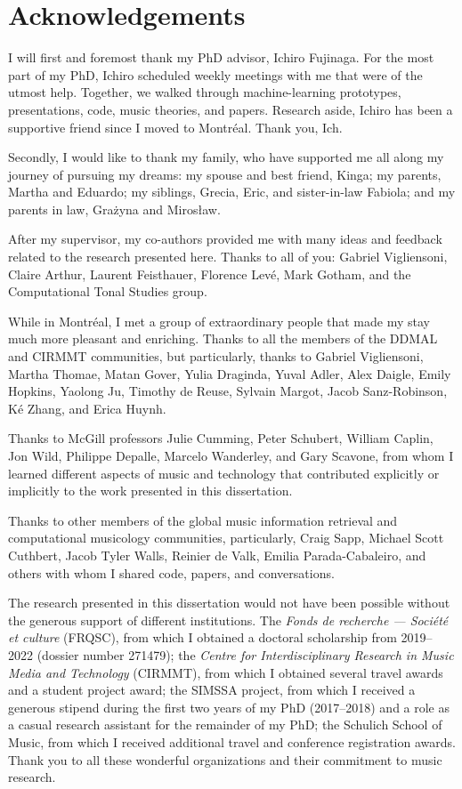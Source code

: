 \chapter*{Acknowledgements}
\label{chap:chap0-ack}

I will first and foremost thank my PhD advisor, Ichiro Fujinaga.
For the most part of my PhD, Ichiro scheduled weekly meetings with me that were of the utmost help.
Together, we walked through machine-learning prototypes, presentations, code, music theories, and papers.
Research aside, Ichiro has been a supportive friend since I moved to Montr\'eal.
Thank you, Ich.

Secondly, I would like to thank my family, who have supported me all along my journey of pursuing my dreams: my spouse and best friend, Kinga; my parents, Martha and Eduardo; my siblings, Grecia, Eric, and sister-in-law Fabiola; and my parents in law, Gra\.zyna and Miros\l{}aw.

After my supervisor, my co-authors provided me with many ideas and feedback related to the research presented here.
Thanks to all of you: Gabriel Vigliensoni, Claire Arthur, Laurent Feisthauer, Florence Lev\'e, Mark Gotham, and the Computational Tonal Studies group.

While in Montr\'eal, I met a group of extraordinary people that made my stay much more pleasant and enriching.
Thanks to all the members of the DDMAL and CIRMMT communities, but particularly, thanks to Gabriel Vigliensoni, Martha Thomae, Matan Gover, Yulia Draginda, Yuval Adler, Alex Daigle, Emily Hopkins, Yaolong Ju, Timothy de Reuse, Sylvain Margot, Jacob Sanz-Robinson, K\'e Zhang, and Erica Huynh.

Thanks to McGill professors Julie Cumming, Peter Schubert, William Caplin, Jon Wild, Philippe Depalle, Marcelo Wanderley, and Gary Scavone, from whom I learned different aspects of music and technology that contributed explicitly or implicitly to the work presented in this dissertation.

Thanks to other members of the global music information retrieval and computational musicology communities, particularly, Craig Sapp, Michael Scott Cuthbert, Jacob Tyler Walls, Reinier de Valk, Emilia Parada-Cabaleiro, and others with whom I shared code, papers, and conversations.

The research presented in this dissertation would not have been possible without the generous support of different institutions. The \emph{Fonds de recherche --- Soci\'et\'e et culture} (FRQSC), from which I obtained a doctoral scholarship from 2019--2022 (dossier number 271479); the \emph{Centre for Interdisciplinary Research in Music Media and Technology} (CIRMMT), from which I obtained several travel awards and a student project award; the SIMSSA project, from which I received a generous stipend during the first two years of my PhD (2017--2018) and a role as a casual research assistant for the remainder of my PhD; the Schulich School of Music, from which I received additional travel and conference registration awards.
Thank you to all these wonderful organizations and their commitment to music research.

